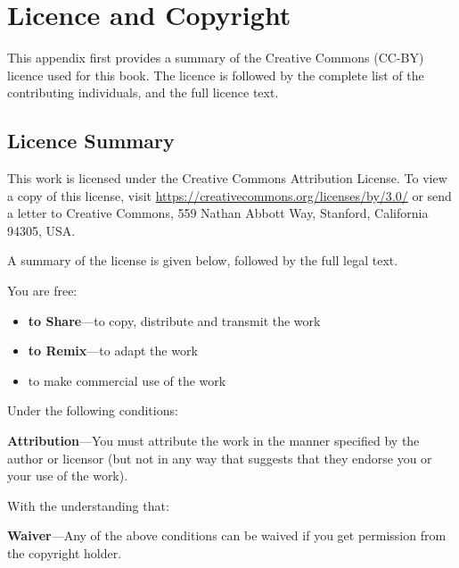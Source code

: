 \documentclass[a4paper,10pt,twoside]{book}
\begin{document}
  \sloppy
\fi


\chapter{Licence and Copyright}


This appendix first provides a summary of the Creative Commons (CC-BY) licence used for this book. 
The licence is followed by the complete list of the contributing individuals, and the full licence text.

\section{Licence Summary}

This work is licensed under the Creative Commons Attribution License.
To view a copy of this license, visit 
\url{https://creativecommons.org/licenses/by/3.0/} or send a letter to
Creative Commons, 559 Nathan Abbott Way, Stanford, California 94305, USA.

\noindent A summary of the license is given below, followed by the full legal text.

\noindent You are free:

\begin{itemize}
  \item \textbf{to Share}---to copy, distribute and transmit the work
  \item \textbf{to Remix}---to adapt the work
  \item to make commercial use of the work
\end{itemize}

\noindent Under the following conditions:
	
\noindent \textbf{Attribution}---You must attribute the work in the
manner specified by the author or licensor (but not in any way that
suggests that they endorse you or your use of the work).

\bigskip

\noindent With the understanding that: 

\noindent \textbf{Waiver}---Any of the above conditions can be waived if
  you get permission from the copyright holder.
\end{document}
